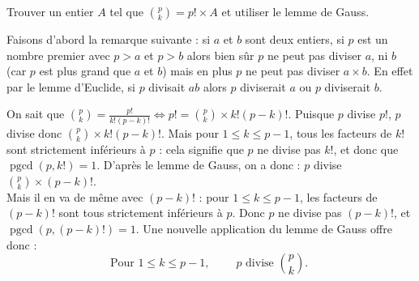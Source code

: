 \documentclass[11pt,class=report,crop=false]{standalone}
\newcommand{\pgcd}{\mathop{\mathrm{pgcd}}\nolimits}
\begin{document}
\indication
Trouver un entier $A$ tel que $\binom{p}{k} = p! \times A$ et utiliser le lemme de Gauss.
\finindication

\correction
Faisons d'abord la remarque suivante : si $a$ et $b$ sont deux entiers, si $p$ est un nombre premier avec $p>a$ et $p>b$ alors bien sûr $p$ ne peut pas diviser $a$, ni $b$ (car $p$ est plus grand que $a$ et $b$) mais en plus $p$ ne peut pas diviser $a \times b$. En effet par le lemme d'Euclide, si $p$ divisait $ab$ alors $p$ diviserait $a$ ou $p$ diviserait $b$.

\bigskip

On sait que $\binom{p}{k} = \frac{p!}{k!(p-k)!} \iff p! = \binom{p}{k} \times k! (p-k)!$. Puisque $p$ divise $p!$, $p$ divise donc $\binom{p}{k} \times k! (p-k)!$. Mais pour $1 \leq k \leq p-1$, tous les facteurs de $k!$ sont strictement inférieurs à $p$ : cela signifie que $p$ ne divise pas $k!$, et donc que $\pgcd(p,k!)=1$. D'après le lemme de Gauss, on a donc : $p$ divise $\binom{p}{k} \times (p-k)!$.\\
Mais il en va de même avec $(p-k)!$ : pour $1 \leq k \leq p-1$, les facteurs de $(p-k)!$ sont tous strictement inférieurs à $p$. Donc $p$ ne divise pas $(p-k)!$, et $\pgcd(p,(p-k)!) = 1$. Une nouvelle application du lemme de Gauss offre donc : 
$$ \boxed{\text{Pour } 1 \le k \le p-1,\qquad   \; p \text{ divise } \binom{p}{k}. \; }$$
\fincorrection
\finexercice
\end{document}
